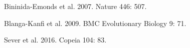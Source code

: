 \documentclass[t]{beamer}
\begin{document}
{
\begin{frame}[b]

\hfill\tiny Bininida-Emonds et al. 2007. Nature 446: 507.
\end{frame}
}
%
{
\begin{frame}[b]

\hfill\tiny Blanga-Kanfi et al. 2009. BMC Evolutionary Biology 9: 71.
\end{frame}
}
%
%	
%	
%	
%
%	
%	
%	
%	
%	
%	
%
%	
%	
%	
%	
%	
%	
%	
%
%	
%
{
\begin{frame}[b]

\hfill\tiny Sever et al. 2016. Copeia 104: 83.
\end{frame}
}
%
\end{document}
